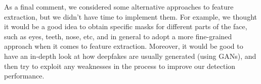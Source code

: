 \documentclass[11pt]{article}
\begin{document}
As a final comment, we considered some alternative approaches to feature extraction, but we didn't have time to implement them. For example, we thought it would be a good idea to obtain specific masks for different parts of the face, such as eyes, teeth, nose, etc, and in general to adopt a more fine-grained approach when it comes to feature extraction. Moreover, it would be good to have an in-depth look at how deepfakes are usually generated (using GANs), and then try to exploit any weaknesses in the process to improve our detection performance.




\end{document}
